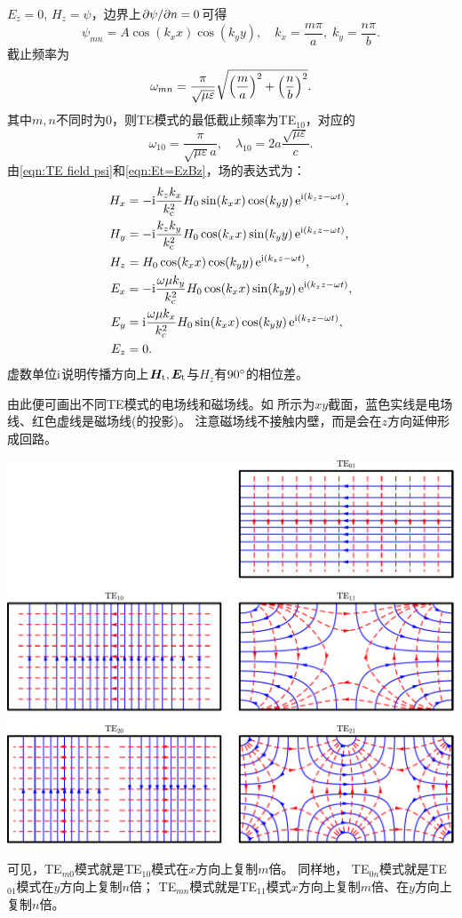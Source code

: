 $E_z=0,\,H_z=\psi$，边界上$\partial\psi/\partial n=0$可得
\begin{equation}
    \psi_{mn}=A\cos(k_xx)\cos(k_yy),\quad k_x=\frac{m\pi}a,\;k_y=\frac{n\pi}b.
\end{equation}
截止频率为
\begin{equation}
    \omega_{mn}=\frac\pi{\sqrt{\mu\varepsilon}}\sqrt{\Bigl(\frac ma\Bigr)^2+\Bigl(\frac nb\Bigr)^2}.
\end{equation}
其中$m,n$不同时为0，则TE模式的最低截止频率为TE$_{10}$，对应的
\[
    \omega_{10}=\frac\pi{\sqrt{\mu\varepsilon}a},\quad\lambda_{10}=2a\frac{\sqrt{\mu\varepsilon}}c.
\]
由\eqref{eqn:TE field psi}和\eqref{eqn:Et=EzBz}，场的表达式为：
\begin{subequations}
    \begin{align}
        H_x&=-\mathrm{i}\frac{k_zk_x}{k_\text c^2}H_0\sin(k_xx)\cos(k_yy)\mathop{}\!\mathrm{e}^{\mathrm{i}(k_zz-\omega t)},\\
        H_y&=-\mathrm{i}\frac{k_zk_y}{k_\text c^2}H_0\cos(k_xx)\sin(k_yy)\mathop{}\!\mathrm{e}^{\mathrm{i}(k_zz-\omega t)},\\
        H_z&=H_0\cos(k_xx)\cos(k_yy)\mathop{}\!\mathrm{e}^{\mathrm{i}(k_zz-\omega t)},\\
        E_x&=-\mathrm{i}\frac{\omega\mu k_y}{k_\text c^2}H_0\cos(k_xx)\sin(k_yy)\mathop{}\!\mathrm{e}^{\mathrm{i}(k_zz-\omega t)},\\
        E_y&=\mathrm{i}\frac{\omega\mu k_x}{k_\text c^2}H_0\sin(k_xx)\cos(k_yy)\mathop{}\!\mathrm{e}^{\mathrm{i}(k_zz-\omega t)},\\
        E_z&=0.
    \end{align}
\end{subequations}
虚数单位$\mathrm{i}$说明传播方向上$\bm H_\text t,\bm E_\text t$与$H_z$有$90^\circ$的相位差。

由此便可画出不同TE模式的电场线和磁场线。如 所示为$xy$截面，蓝色实线是电场线、红色虚线是磁场线(的投影)。
注意磁场线不接触内壁，而是会在$z$方向延伸形成回路。
\begin{center}
    \includegraphics[width=0.8\linewidth]{figures/waveguide_rect_TE.pdf}
    \label{fig:waveguide rect TE}
\end{center}
可见，TE$_{m0}$模式就是TE$_{10}$模式在$x$方向上复制$m$倍。
同样地，
TE$_{0n}$模式就是TE$_{01}$模式在$y$方向上复制$n$倍；
TE$_{mn}$模式就是TE$_{11}$模式$x$方向上复制$m$倍、在$y$方向上复制$n$倍。

